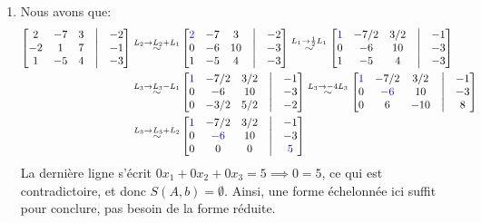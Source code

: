 \begin{exercice}
\begin{enumerate}
    \item Nous avons que:
    \begin{align*}
        \begin{bmatrix}
        2 & -7 & 3 & \bigm| & -2 \\
        -2 & 1 & 7 & \bigm| & -1 \\
        1 & -5 & 4 & \bigm| & -3
        \end{bmatrix}
        \overset{L_2 \rightarrow L_2 +L_1}{\sim}
        &\begin{bmatrix}
        \color{blue}2 & -7 & 3 & \bigm| & -2 \\
        0 & -6 & 10 & \bigm| & -3 \\
        1 & -5 & 4 & \bigm| & -3
        \end{bmatrix}
        \overset{L_1 \rightarrow \frac{1}{2}L_1}{\sim}
        \begin{bmatrix}
       \color{blue} 1 & -7/2 & 3/2 & \bigm| & -1 \\
        0 & -6 & 10 & \bigm| & -3 \\
        1 & -5 & 4 & \bigm| & -3
        \end{bmatrix} \\
        \overset{L_3 \rightarrow L_3 - L_1}{\sim}
        &\begin{bmatrix}
        \color{blue}1 & -7/2 & 3/2 & \bigm| & -1 \\
        0 & -6 & 10 & \bigm| & -3 \\
        0 & -3/2 & 5/2 & \bigm| & -2
        \end{bmatrix}
        \overset{L_3 \rightarrow -4L_3}{\sim}
        \begin{bmatrix}
        \color{blue}1 & -7/2 & 3/2 & \bigm| & -1 \\
        0 &\color{blue} -6 & 10 & \bigm| & -3 \\
        0 & 6 & -10 & \bigm| & 8 %
        \end{bmatrix} \\
        \overset{L_3 \rightarrow L_3+L_2}{\sim}
        &\begin{bmatrix}
        \color{blue}1 & -7/2 & 3/2 & \bigm| & -1 \\
        0 & \color{blue}-6 & 10 & \bigm| & -3 \\
        0 & 0 & 0 & \bigm| & \color{blue}5
        \end{bmatrix}
    \end{align*}
    La dernière ligne s'écrit $0x_1 + 0 x_2 + 0x_3 = 5 \implies 0=5$, ce qui est contradictoire, et donc $S(A,b) = \emptyset$. Ainsi, une forme échelonnée ici suffit pour conclure, pas besoin de la forme réduite. \\
\end{enumerate}
\end{exercice}
